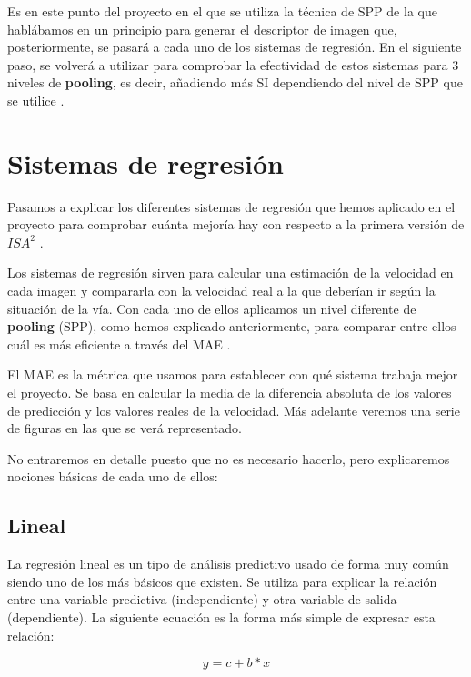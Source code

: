 Es en este punto del proyecto en el que se utiliza la técnica de \ac{SPP} \cite{spp} de la que hablábamos en un principio para generar el descriptor de imagen que, posteriormente, se pasará a cada uno de los sistemas de regresión. En el siguiente paso, se volverá a utilizar para comprobar la efectividad de estos sistemas para 3 niveles de \textbf{pooling}, es decir, añadiendo más \ac{SI} dependiendo del nivel de \ac{SPP} que se utilice \cite{isa2}.

\section{Sistemas de regresión}

Pasamos a explicar los diferentes sistemas de regresión que hemos aplicado en el proyecto para comprobar cuánta mejoría hay con respecto a la primera versión de $ISA^{2}$ \cite{isa2}.

Los sistemas de regresión sirven para calcular una estimación de la velocidad en cada imagen y compararla con la velocidad real a la que deberían ir según la situación de la vía. Con cada uno de ellos aplicamos un nivel diferente de \textbf{pooling} (\ac{SPP}), como hemos explicado anteriormente, para comparar entre ellos cuál es más eficiente a través del \ac{MAE} \cite{mae}.
 
El \ac{MAE} es la métrica que usamos para establecer con qué sistema trabaja mejor el proyecto. Se basa en calcular la media de la diferencia absoluta de los valores de predicción y los valores reales de la velocidad. Más adelante veremos una serie de figuras en las que se verá representado.

No entraremos en detalle puesto que no es necesario hacerlo, pero explicaremos nociones básicas de cada uno de ellos:

\subsection{Lineal}

La regresión lineal \cite{linear} es un tipo de análisis predictivo usado de forma muy común siendo uno de los más básicos que existen. Se utiliza para explicar la relación entre una variable predictiva (independiente) y otra variable de salida (dependiente). La siguiente ecuación es la forma más simple de expresar esta relación:

\begin{equation}
y = c + b*x
\end{equation}

